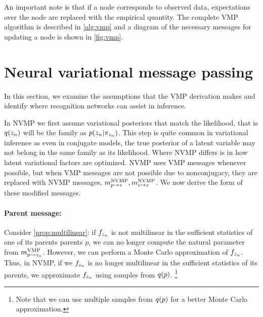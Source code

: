 An important note is that if a node corresponds to observed data,
expectations over the node are replaced with the empirical quantity.
The complete VMP algorithm is described in \autoref{alg:vmp} and
a diagram of the necessary messages for updating a node
is shown in \autoref{fig:vmp}.

\section{Neural variational message passing}
\label{sec:nvmp}

In this section, we examine
the assumptions that the VMP derivation makes
and identify where recognition networks
can assist in inference.

In NVMP we first
assume variational posteriors that match
the likelihood, that is $q(z_n)$ will
be the family as $p(z_n | \pi_{z_n})$. 
This step 
is quite common in variational inference
as even in conjugate
models, the true posterior of a latent variable may not belong
in the same family as its likelihood.
Where NVMP differs is in how latent variational factors
are optimized.
NVMP uses VMP messages whenever possible,
but when VMP messages are not possible due to 
nonconjugacy, they are replaced with NVMP messages,
$m^{\text{NVMP}}_{p \rightarrow z},m^{\text{NVMP}}_{c \rightarrow z}$.
We now derive the form of these modified messages.

\paragraph{Parent message:}
Consider \autoref{prop:multilinear}:
if $f_{z_n}$ is not multilinear in the sufficient statistics of one of
its parents
parents $p$,
we can no longer compute the natural parameter
from $m^{\text{VMP}}_{p \rightarrow z_n}$.
However, we can perform a Monte Carlo approximation of $f_{z_n}$.
Thus, in NVMP, if we $f_{z_n}$ is no longer
multilinear in the sufficient statistics of its parents,
we approximate $f_{z_n}$ using samples from $q(p)$.
\footnote{Note that we can use multiple samples from $q(p)$ for a better Monte Carlo
approximation.}

